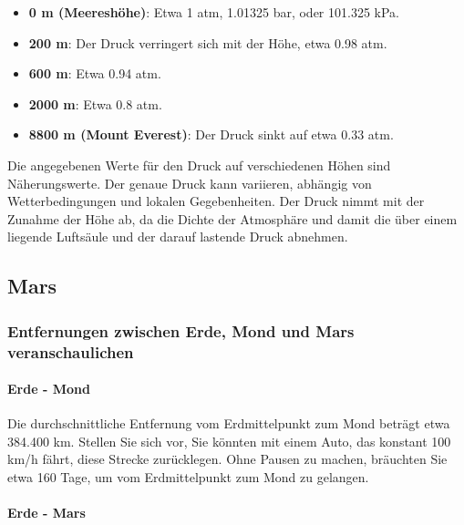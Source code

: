 \documentclass{vorlage-design-main}
\begin{document}
\begin{itemize}

\item
  \textbf{0 m (Meereshöhe)}: Etwa 1 atm, 1.01325 bar, oder 101.325 kPa.
\item
  \textbf{200 m}: Der Druck verringert sich mit der Höhe, etwa 0.98 atm.
\item
  \textbf{600 m}: Etwa 0.94 atm.
\item
  \textbf{2000 m}: Etwa 0.8 atm.
\item
  \textbf{8800 m (Mount Everest)}: Der Druck sinkt auf etwa 0.33 atm.
\end{itemize}

Die angegebenen Werte für den Druck auf verschiedenen Höhen sind
Näherungswerte. Der genaue Druck kann variieren, abhängig von
Wetterbedingungen und lokalen Gegebenheiten. Der Druck nimmt mit der
Zunahme der Höhe ab, da die Dichte der Atmosphäre und damit die über
einem liegende Luftsäule und der darauf lastende Druck abnehmen.

\hypertarget{mars}{%
\subsection{Mars}\label{mars}}

\hypertarget{entfernungen-zwischen-erde-mond-und-mars-veranschaulichen}{%
\subsubsection{Entfernungen zwischen Erde, Mond und Mars
veranschaulichen}\label{entfernungen-zwischen-erde-mond-und-mars-veranschaulichen}}

\hypertarget{erde---mond}{%
\paragraph{Erde - Mond}\label{erde---mond}}

Die durchschnittliche Entfernung vom Erdmittelpunkt zum Mond beträgt
etwa 384.400 km. Stellen Sie sich vor, Sie könnten mit einem Auto, das
konstant 100 km/h fährt, diese Strecke zurücklegen. Ohne Pausen zu
machen, bräuchten Sie etwa 160 Tage, um vom Erdmittelpunkt zum Mond zu
gelangen.

\hypertarget{erde---mars}{%
\paragraph{Erde - Mars}\label{erde---mars}}
\end{document}
